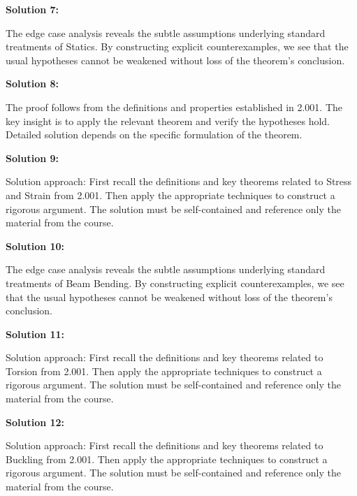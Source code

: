 \documentclass[12pt,a4paper]{exam}
\begin{document}
\vspace{0.5cm}

\textbf{Solution 7:}

The edge case analysis reveals the subtle assumptions underlying standard treatments of Statics. By constructing explicit counterexamples, we see that the usual hypotheses cannot be weakened without loss of the theorem's conclusion.

\vspace{0.5cm}

\textbf{Solution 8:}

The proof follows from the definitions and properties established in 2.001. The key insight is to apply the relevant theorem and verify the hypotheses hold. Detailed solution depends on the specific formulation of the theorem.

\vspace{0.5cm}

\textbf{Solution 9:}

Solution approach: First recall the definitions and key theorems related to Stress and Strain from 2.001. Then apply the appropriate techniques to construct a rigorous argument. The solution must be self-contained and reference only the material from the course.

\vspace{0.5cm}

\textbf{Solution 10:}

The edge case analysis reveals the subtle assumptions underlying standard treatments of Beam Bending. By constructing explicit counterexamples, we see that the usual hypotheses cannot be weakened without loss of the theorem's conclusion.

\vspace{0.5cm}

\textbf{Solution 11:}

Solution approach: First recall the definitions and key theorems related to Torsion from 2.001. Then apply the appropriate techniques to construct a rigorous argument. The solution must be self-contained and reference only the material from the course.

\vspace{0.5cm}

\textbf{Solution 12:}

Solution approach: First recall the definitions and key theorems related to Buckling from 2.001. Then apply the appropriate techniques to construct a rigorous argument. The solution must be self-contained and reference only the material from the course.
\end{document}
